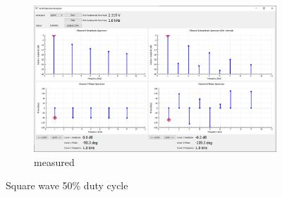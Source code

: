 \documentclass[notitlepage, a4paper, 11pt]{article}
\begin{document}
\begin{figure}[H]
\begin{subfigure}[][][t]{0.3\textwidth}
			\includegraphics[width=\textwidth, trim=10 80 555 100, clip]{../img/Circuit1/dut50}
			\caption{measured}
			\label{fig:meas-signal-b}
		\end{subfigure}
		\caption{Square wave 50\% duty cycle}
		\label{fig:pure-sqr50}
	\end{figure}
	
\end{document}

